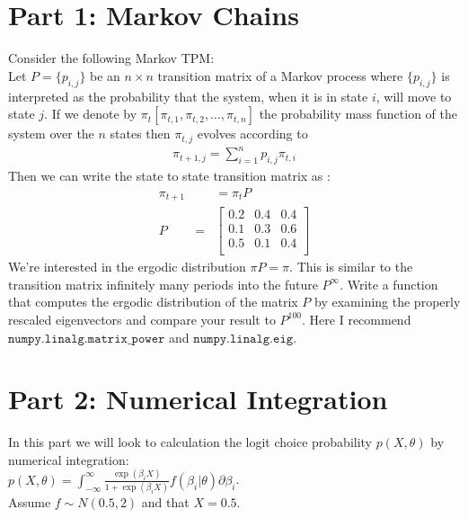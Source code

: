 \documentclass{article}
\begin{document}
\section*{Part 1: Markov Chains}
Consider the following Markov TPM:\\
Let $P = \{p_{i,j} \}$ be an $n \times n$ transition matrix of a Markov process where $\{p_{i,j} \}$ is interpreted as the probability that the system, when it is in state $i$, will move to state $j$. If we denote by $\pi_t [ \pi_{t,1} , \pi_{t,2}, \ldots, \pi_{t,n}]$ the probability mass function of the system over the $n$ states then $\pi_{t,j}$ evolves according to 
\begin{eqnarray*}
\pi_{t+1,j} = \sum_{i=1}^n p_{i,j} \pi_{t,i}
\end{eqnarray*}
Then we can write the state to state transition matrix as :
\begin{eqnarray*}
\pi_{t+1}& &= \pi_t P \\
P &=&
\left[ {\begin{array}{ccc}
    0.2&    0.4&    0.4\\
    0.1&    0.3&    0.6\\
    0.5&    0.1&    0.4\\
 \end{array} } \right]
\end{eqnarray*}
We're interested in the ergodic distribution $\pi P = \pi$. This is similar to the transition matrix infinitely many periods into the future $P^{\infty}$. Write a function that computes the ergodic distribution of the matrix $P$ by examining the properly rescaled eigenvectors and compare your result to $P^{100}$. Here I recommend $\mathtt{numpy.linalg.matrix\_power}$ and $\mathtt{numpy.linalg.eig}$.
\section*{Part 2: Numerical Integration}
In this part we will look to calculation the logit choice probability $p(X,\theta)$ by numerical integration:\\
 $p(X,\theta) =\int_{-\infty}^{\infty} \frac{\exp(\beta_i X)}{1+ \exp(\beta_i X)} f(\beta_i | \theta) \partial \beta_i$. \\
 Assume $f \sim N(0.5,2)$ and that $X = 0.5$.
 
\end{document}
